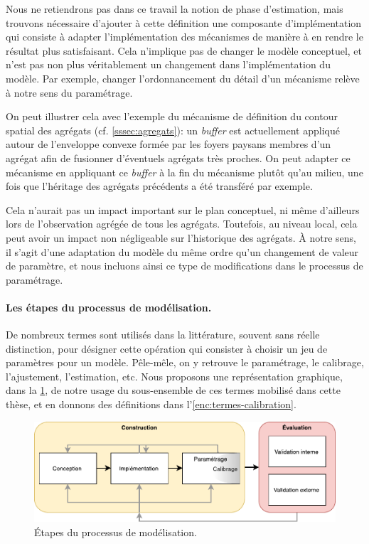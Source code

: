 Nous ne retiendrons pas dans ce travail la notion de phase d'estimation, mais trouvons nécessaire d'ajouter à cette définition une composante d'implémentation qui consiste à adapter l'implémentation des mécanismes de manière à en rendre le résultat plus satisfaisant.
Cela n'implique pas de changer le modèle conceptuel, et n'est pas non plus véritablement un changement dans l'implémentation du modèle.
Par exemple, changer l'ordonnancement du détail d'un mécanisme relève à notre sens du paramétrage.

On peut illustrer cela avec l'exemple du mécanisme de définition du contour spatial des agrégats (cf. \cref{sssec:agregats}): un \textit{buffer} est actuellement appliqué autour de l'enveloppe convexe formée par les foyers paysans membres d'un agrégat afin de fusionner d'éventuels agrégats très proches.
On peut adapter ce mécanisme en appliquant ce \textit{buffer} à la fin du mécanisme plutôt qu'au milieu, une fois que l'héritage des agrégats précédents a été transféré par exemple.

Cela n'aurait pas un impact important sur le plan conceptuel, ni même d'ailleurs lors de l'observation agrégée de tous les agrégats.
Toutefois, au niveau local, cela peut avoir un impact non négligeable sur l'historique des agrégats.
À notre sens, il s'agit d'une adaptation du modèle du même ordre qu'un changement de valeur de paramètre, et nous incluons ainsi ce type de modifications dans le processus de paramétrage.


\paragraph{Les étapes du processus de modélisation.}

De nombreux termes sont utilisés dans la littérature, souvent sans réelle distinction, pour désigner cette opération qui consister à choisir un jeu de paramètres pour un modèle.
Pêle-mêle, on y retrouve le paramétrage, le calibrage, l'ajustement, l'estimation, etc.
Nous proposons une représentation graphique, dans la \cref{fig:etapes-modelisation}, de notre usage du sous-ensemble de ces termes mobilisé dans cette thèse, et en donnons des définitions dans l'\cref{enc:termes-calibration}.

\begin{figure}[H]
	\includegraphics[width=1\textwidth]{img/schema_definition_parametrage.pdf}
	\caption{Étapes du processus de modélisation.} 
	\label{fig:etapes-modelisation} 
\end{figure}


